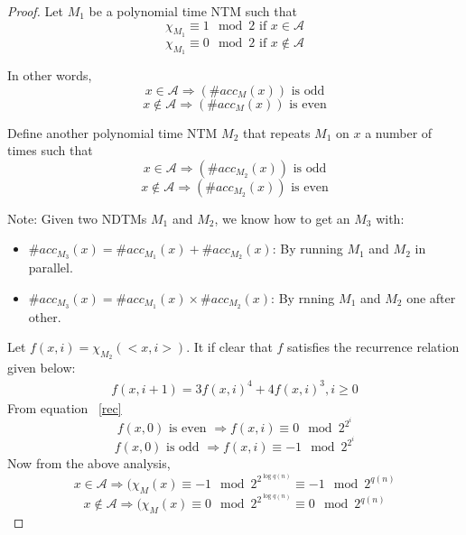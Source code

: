 \documentclass[11pt]{article}
\begin{document}
\begin{proof} Let $M_1$ be a polynomial time NTM such that
$$\chi_{M_1}\equiv 1\mod 2\mbox{ if } x\in \mathcal{A}$$ %
$$\chi_{M_1}\equiv 0\mod 2 \mbox{ if }x\notin \mathcal{A}$$ 

In other words,
$$x\in \mathcal{A}\Rightarrow (\#acc_M(x)) \mbox{ is odd}$$
$$x\notin \mathcal{A}\Rightarrow (\#acc_M(x))\mbox{ is even}$$


Define another polynomial time NTM $M_2$ that repeats $M_1$ on $x$ a
number of times such that
$$x\in \mathcal{A}\Rightarrow (\#acc_{M_2}(x)) \mbox{ is odd}$$
$$x\notin \mathcal{A}\Rightarrow (\#acc_{M_2}(x))\mbox{ is even}$$

Note: Given two NDTMs $M_1$ and $M_2$, we know how to get an $M_3$
with:
\begin{itemize}
\item $\#acc_{M_3}(x)=\#acc_{M_1}(x)+\#acc_{M_2}(x) $: By running
$M_1$ and $M_2$ in parallel.
\item $\#acc_{M_3}(x)=\#acc_{M_1}(x)\times\#acc_{M_2}(x) $: By rnning
$M_1$ and $M_2$ one after other.
\end{itemize}
\begin{comment} The following psuedocode represents the working of
$M_2$ in a recursive form.  Non-deterministic Turing machine:
$M_2(<x,i>)$\\ //$i$: Number of times $M_2$ executes $M_1$.\\
\begin{enumerate}
\item If $i=0$, then simulate $M_1(x)$
\item Else if $i>0$
	\begin{enumerate}
	\item Nondeterministically choose an integer
$m\in\{1,2,\cdots,7\}$
	\item If $m\leq 4$ then let $k=3$ else let $k=4$
	\item For $j=1$ to $k$ do
		\begin{enumerate}
		\item recursively run $M_2(<x,i-1>)$
		\item if $M_2(<x,i-1>)$ rejects then reject and halt
		\end{enumerate}
	\item Accept and halt
	\end{enumerate}
\end{enumerate}
\end{comment}

Let $f(x,i)=\chi_{M_2}(<x,i>)$. It if clear that $f$ satisfies the
recurrence relation given below:
\begin{eqnarray}
\label{rec} f(x,i+1)=3f(x,i)^4+4f(x,i)^3, i\geq0
\end{eqnarray} From equation ~\ref{rec}
$$f(x,0)\mbox{ is even }\Rightarrow f(x,i)\equiv 0\mod 2^{2^i}$$
$$f(x,0)\mbox{ is odd }\Rightarrow f(x,i)\equiv -1\mod 2^{2^i}$$
Now from the above analysis,
$$x\in \mathcal{A}\Rightarrow (\chi_M(x)\equiv  -1\mod 2^{2^{\log q(n)}}\equiv -1\mod 2^{q(n)}$$
$$x\notin \mathcal{A}\Rightarrow (\chi_M(x)\equiv  0\mod 2^{2^{\log q(n)}}\equiv 0\mod 2^{q(n)}$$
\end{proof}
\end{document}
